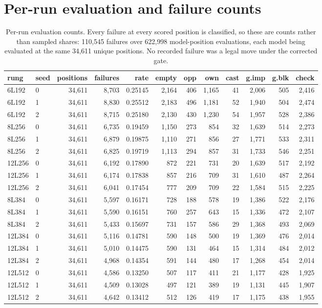 \documentclass[11pt]{article}
\begin{document}
\section{Per-run evaluation and failure counts}

\begin{table}[htbp]
\centering\small
\caption{Per-run evaluation counts. Every failure at every scored position is classified, so these are counts rather than sampled shares: 110,545 failures over 622,998 model-position evaluations, each model being evaluated at the same 34,611 unique positions. No recorded failure was a legal move under the corrected gate.}
\label{tab:s-counts}
\begin{tabular}{llrrrrrrrrrr}
\toprule
rung & seed & positions & failures & rate & empty & opp & own & cast & g.imp & g.blk & check \\
\midrule
6L192 & 0 & 34,611 & 8,703 & 0.25145 & 2,164 & 406 & 1,165 & 41 & 2,006 & 505 & 2,416 \\
6L192 & 1 & 34,611 & 8,830 & 0.25512 & 2,183 & 496 & 1,181 & 52 & 1,940 & 504 & 2,474 \\
6L192 & 2 & 34,611 & 8,715 & 0.25180 & 2,130 & 430 & 1,230 & 54 & 1,957 & 528 & 2,386 \\
8L256 & 0 & 34,611 & 6,735 & 0.19459 & 1,150 & 273 & 854 & 32 & 1,639 & 514 & 2,273 \\
8L256 & 1 & 34,611 & 6,879 & 0.19875 & 1,110 & 271 & 856 & 27 & 1,771 & 533 & 2,311 \\
8L256 & 2 & 34,611 & 6,825 & 0.19719 & 1,113 & 294 & 857 & 31 & 1,733 & 546 & 2,251 \\
12L256 & 0 & 34,611 & 6,192 & 0.17890 & 872 & 221 & 731 & 20 & 1,639 & 517 & 2,192 \\
12L256 & 1 & 34,611 & 6,174 & 0.17838 & 857 & 216 & 709 & 31 & 1,610 & 487 & 2,264 \\
12L256 & 2 & 34,611 & 6,041 & 0.17454 & 777 & 209 & 709 & 22 & 1,584 & 515 & 2,225 \\
8L384 & 0 & 34,611 & 5,597 & 0.16171 & 728 & 188 & 578 & 19 & 1,386 & 522 & 2,176 \\
8L384 & 1 & 34,611 & 5,590 & 0.16151 & 760 & 257 & 643 & 15 & 1,336 & 472 & 2,107 \\
8L384 & 2 & 34,611 & 5,433 & 0.15697 & 731 & 157 & 586 & 29 & 1,368 & 493 & 2,069 \\
12L384 & 0 & 34,611 & 5,116 & 0.14781 & 590 & 148 & 500 & 19 & 1,369 & 476 & 2,014 \\
12L384 & 1 & 34,611 & 5,010 & 0.14475 & 590 & 131 & 464 & 15 & 1,314 & 484 & 2,012 \\
12L384 & 2 & 34,611 & 4,968 & 0.14354 & 591 & 144 & 480 & 17 & 1,268 & 454 & 2,014 \\
12L512 & 0 & 34,611 & 4,586 & 0.13250 & 507 & 117 & 411 & 21 & 1,177 & 428 & 1,925 \\
12L512 & 1 & 34,611 & 4,509 & 0.13028 & 497 & 121 & 389 & 19 & 1,131 & 445 & 1,907 \\
12L512 & 2 & 34,611 & 4,642 & 0.13412 & 512 & 126 & 419 & 17 & 1,175 & 438 & 1,955 \\
\bottomrule
\end{tabular}
\end{table}
\end{document}
